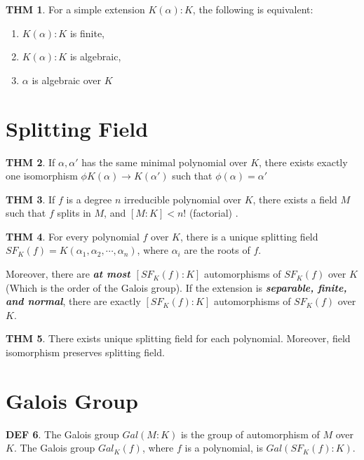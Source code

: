 \documentclass[twocolumn]{article}
\renewcommand{\emph}[1]{\textbf{\textit{#1}}}
\theoremstyle{definition}
\newtheorem{thm}{THM}
\newtheorem{defi}[thm]{DEF}
\theoremstyle{remark}
\begin{document}
\begin{thm}
	For a simple extension $K(\alpha) :K$, the following is equivalent:
	\begin{enumerate}
		\item $K(\alpha): K$ is finite,
		\item $K(\alpha): K$ is algebraic,
		\item $\alpha$ is algebraic over $K$
	\end{enumerate}
\end{thm}

\section{Splitting Field}

\begin{thm}
	If $\alpha, \alpha'$ has the same minimal polynomial over $K$, there exists exactly one isomorphism $\phi K(\alpha) \rightarrow K(\alpha')$ such that $\phi(\alpha) = \alpha'$
\end{thm}

\begin{thm}
	If $f$ is a degree $n$ irreducible polynomial over $K$, there exists a field $M$ such that $f$ splits in $M$, and $[M:K] < n!$ (factorial) .
\end{thm}

\begin{thm}
	For every polynomial $f$ over $K$, there is a unique splitting field $SF_{K}(f) = K (\alpha_1, \alpha_2, \cdots, \alpha_n)$, where $\alpha_i$ are the roots of $f$.

	Moreover, there are \emph{at most $[SF_{K}(f):K]$} automorphisms of $SF_{K}(f)$ over $K$ (Which is the order of the Galois group). 
	If the extension is \emph{separable, finite, and normal}, there are exactly $[SF_{K}(f):K]$ automorphisms of $SF_{K}(f)$ over $K$.
\end{thm}

\begin{thm}
	There exists unique splitting field for each polynomial. Moreover, field isomorphism preserves splitting field.
\end{thm}

\section{Galois Group}

\begin{defi}
	The Galois group $Gal(M:K)$ is the group of automorphism of $M$ over $K$.
	The Galois group $Gal_K(f)$, where $f$ is a polynomial, is $Gal(SF_{K}(f):K)$.
\end{defi}
\end{document}
